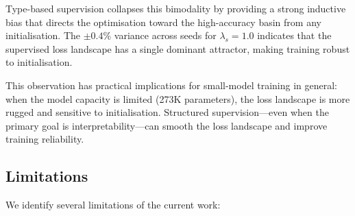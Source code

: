 \documentclass[conference]{IEEEtran}
\begin{document}
Type-based supervision collapses this bimodality by providing
a strong inductive bias that directs the optimisation toward the
high-accuracy basin from any initialisation.  The $\pm 0.4\%$
variance across seeds for $\lambda_s{=}1.0$ indicates that the
supervised loss landscape has a single dominant attractor, making
training robust to initialisation.

This observation has practical implications for small-model
training in general: when the model capacity is limited (273K
parameters), the loss landscape is more rugged and sensitive to
initialisation.  Structured supervision---even when the primary
goal is interpretability---can smooth the loss landscape and
improve training reliability.

\subsection{Limitations}
\label{sec:limitations}

We identify several limitations of the current work:
\end{document}
